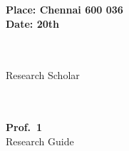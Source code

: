 \parbox{2.5in}{
	\noindent \bf Place: Chennai 600 036\\
	\noindent \bf Date: 20th \MyDate \\ 
}
\hspace*{1.0in}
\parbox{2.5in}{
			\noindent \\
	\noindent \textbf{\MyAuthor} \\
	\noindent Research Scholar \\
}
\hspace*{3.55in}
\parbox{2.5in}{
	\noindent \\
	\noindent \\
	\noindent \textbf{Prof.~1} \\
	\noindent Research Guide \\ %
}




